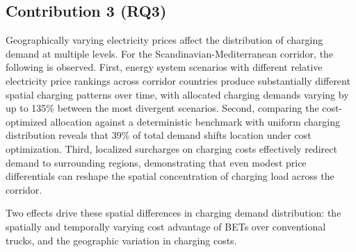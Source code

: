 \newpage
\subsection{Contribution 3 (RQ3)}

\noindent{}

    Geographically varying electricity prices affect the distribution of charging demand at multiple levels. For the Scandinavian-Mediterranean corridor, the following is observed. First, energy system scenarios with different relative electricity price rankings across corridor countries produce substantially different spatial charging patterns over time, with allocated charging demands varying by up to 135\% between the most divergent scenarios. Second, comparing the cost-optimized allocation against a deterministic benchmark with uniform charging distribution reveals that 39\% of total demand shifts location under cost optimization. Third, localized surcharges on charging costs effectively redirect demand to surrounding regions, demonstrating that even modest price differentials can reshape the spatial concentration of charging load across the corridor.
    
    Two effects drive these spatial differences in charging demand distribution: the spatially and temporally varying cost advantage of \acp{BET} over conventional trucks, and the geographic variation in charging costs.

